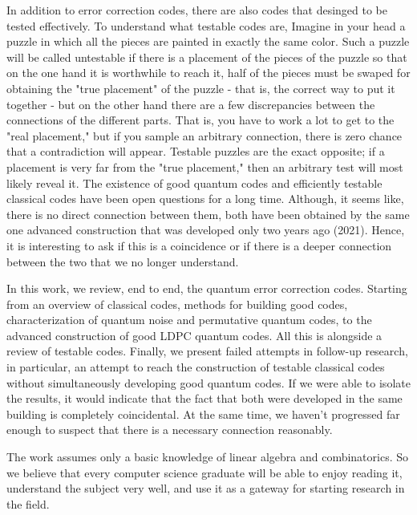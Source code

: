 In addition to error correction codes, there are also codes that desinged to be tested effectively. To understand what testable codes are,  Imagine in your head a puzzle in which all the pieces are painted in exactly the same color. Such a puzzle will be called untestable if there is a placement of the pieces of the puzzle so that on the one hand it is worthwhile to reach it, half of the pieces must be swaped for obtaining  the "true placement" of the puzzle - that is, the correct way to put it together - but on the other hand there are a few discrepancies between the connections of the different parts. That is, you have to work a lot to get to the "real placement," but if you sample an arbitrary connection, there is zero chance that a contradiction will appear. Testable puzzles are the exact opposite; if a placement is very far from the "true placement," then an arbitrary test will most likely reveal it. The existence of good quantum codes and efficiently testable classical codes have been open questions for a long time. Although, it seems like, there is no direct connection between them, both have been obtained by the same one advanced construction that was developed only two years ago (2021). Hence, it is interesting to ask if this is a coincidence or if there is a deeper connection between the two that we no longer understand.

In this work, we review, end to end, the quantum error correction codes. Starting from an overview of classical codes, methods for building good codes, characterization of quantum noise and permutative quantum codes, to the advanced construction of good LDPC quantum codes. All this is alongside a review of testable codes. Finally, we present failed attempts in follow-up research, in particular, an attempt to reach the construction of testable classical codes without simultaneously developing good quantum codes. If we were able to isolate the results, it would indicate that the fact that both were developed in the same building is completely coincidental. At the same time, we haven't progressed far enough to suspect that there is a necessary connection reasonably.

The work assumes only a basic knowledge of linear algebra and combinatorics. So we believe that every computer science graduate will be able to enjoy reading it, understand the subject very well, and use it as a gateway for starting research in the field.


